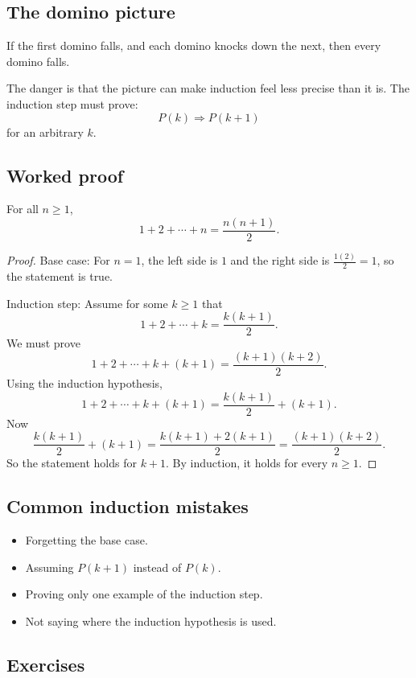 \documentclass[12pt]{article}
\begin{document}
\subsection{The domino picture}

If the first domino falls, and each domino knocks down the next, then every domino falls.

The danger is that the picture can make induction feel less precise than it is. The induction step must prove:
\[
P(k)\Rightarrow P(k+1)
\]
for an arbitrary $k$.

\subsection{Worked proof}

\begin{theorem}
For all $n\geq1$,
\[
1+2+\cdots+n=\frac{n(n+1)}2.
\]
\end{theorem}

\begin{proof}
Base case: For $n=1$, the left side is $1$ and the right side is $\frac{1(2)}2=1$, so the statement is true.

Induction step: Assume for some $k\geq1$ that
\[
1+2+\cdots+k=\frac{k(k+1)}2.
\]
We must prove
\[
1+2+\cdots+k+(k+1)=\frac{(k+1)(k+2)}2.
\]
Using the induction hypothesis,
\[
1+2+\cdots+k+(k+1)=\frac{k(k+1)}2+(k+1).
\]
Now
\[
\frac{k(k+1)}2+(k+1)
=\frac{k(k+1)+2(k+1)}2
=\frac{(k+1)(k+2)}2.
\]
So the statement holds for $k+1$. By induction, it holds for every $n\geq1$.
\end{proof}

\subsection{Common induction mistakes}

\begin{itemize}
\item Forgetting the base case.
\item Assuming $P(k+1)$ instead of $P(k)$.
\item Proving only one example of the induction step.
\item Not saying where the induction hypothesis is used.
\end{itemize}

\subsection{Exercises}
\end{document}
